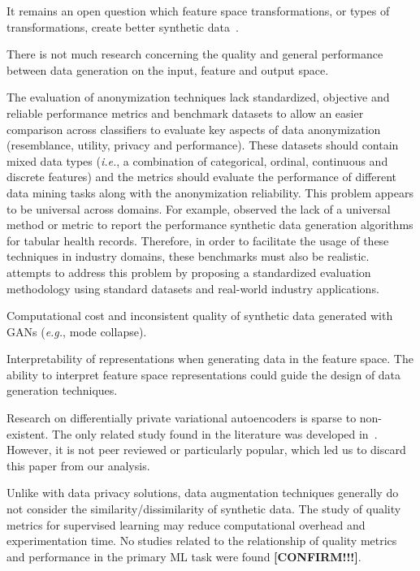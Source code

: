 \documentclass[parskip=full]{scrartcl}
\begin{document}
It remains an open question which feature space transformations, or types of
transformations, create better synthetic data~\cite{cheung2020modals}.


There is not much research concerning the quality and general performance
between data generation on the input, feature and output space.

The evaluation of anonymization techniques lack standardized, objective and
reliable performance metrics and benchmark datasets to allow an easier
comparison across classifiers to evaluate key aspects of data anonymization
(resemblance, utility, privacy and performance). These datasets should contain
mixed data types (\textit{i.e.}, a combination of categorical, ordinal,
continuous and discrete features) and the metrics should evaluate the
performance of different data mining tasks along with the anonymization
reliability. This problem appears to be universal across domains. For example,
\citet{hernandez2022synthetic} observed the lack of a universal method or
metric to report the performance synthetic data generation algorithms for
tabular health records. Therefore, in order to facilitate the usage of these
techniques in industry domains, these benchmarks must also be
realistic. \citet{rosenblatt2020differentially} attempts to address this
problem by proposing a standardized evaluation methodology using standard
datasets and real-world industry applications.

Computational cost and inconsistent quality of synthetic data generated with
GANs (\textit{e.g.}, mode collapse).

Interpretability of representations when generating data in the feature space.
The ability to interpret feature space representations could 
guide the design of data generation techniques. 

Research on differentially private variational autoencoders is sparse to
non-existent. The only related study found in the literature was developed
in~\cite{takahashi2020differentially}. However, it is not peer reviewed or
particularly popular, which led us to discard this paper from our analysis.

Unlike with data privacy solutions, data augmentation techniques generally do
not consider the similarity/dissimilarity of synthetic data. The study of
quality metrics for supervised learning may reduce computational overhead and
experimentation time. No studies related to the relationship of quality
metrics and performance in the primary ML task were found
\textbf{[CONFIRM!!!]}.
\end{document}
